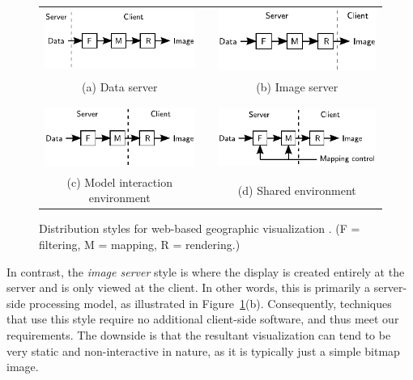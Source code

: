 \documentclass[acmnow]{acmtrans2m}
\begin{document}
\begin{figure}
	\centering
	\begin{tabular}{ccc}
		\includegraphics[scale=0.9]{data_server}	&
		\qquad	&
		\includegraphics[scale=0.9]{image_server}	\\
		\footnotesize (a) Data server	&
		\qquad	&
		\footnotesize (b) Image server	\\
		\\
		\\
		\includegraphics[scale=0.9]{model_interaction}	&
		\qquad	&
		\includegraphics[scale=0.9]{shared}	\\
		\footnotesize (c) Model interaction environment	&
		\qquad	&
		\footnotesize (d) Shared environment	\\
	\end{tabular}
	\caption{Distribution styles for web-based geographic visualization
	\protect\cite{Wood-J-1996-vis}. (F = filtering, M = mapping, R =
	rendering.)}
	\label{fig-distribution-styles}
\end{figure}


In contrast, the \emph{image server} style is where the display is
created entirely at the server and is only viewed at the client. In
other words, this is primarily a server-side processing model, as
illustrated in Figure~\ref{fig-distribution-styles}(b). Consequently,
techniques that use this style require no additional client-side
software, and thus meet our requirements. The downside is that the
resultant visualization can tend to be very static and non-interactive
in nature, as it is typically just a simple bitmap image.
\end{document}
